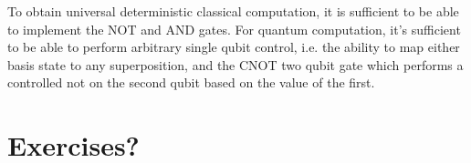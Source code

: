 To obtain universal deterministic classical computation, it is sufficient to be able to implement the NOT and AND gates. For quantum computation, it's sufficient to be able to perform arbitrary single qubit control, i.e. the ability to map either basis state to any superposition, and the CNOT two qubit gate which performs a controlled not on the second qubit based on the value of the first.

\section{Exercises?} 